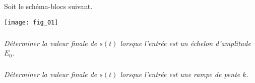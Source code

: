 \setcounter{exo}{0}

Soit le schéma-blocs suivant.
\begin{center}
\texttt{[image: fig\_01]}
\end{center}

\subparagraph{}
\textit{Déterminer la valeur finale de $s(t)$ lorsque l'entrée est un échelon d'amplitude $E_0$.}

\subparagraph{}
\textit{Déterminer la valeur finale de $s(t)$ lorsque l'entrée est une rampe de pente $k$.}
